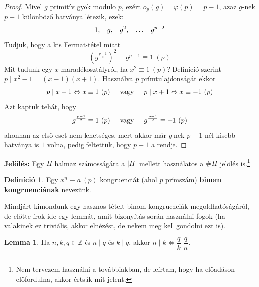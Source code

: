 \documentclass[12pt]{book}
\theoremstyle{plain} %
\theoremstyle{definition} %
\newtheorem{defi/}{Definíció}[section]
\newenvironment{defi}
  {\renewcommand{\qedsymbol}{$\clubsuit$}%
   \pushQED{\qed}\begin{defi/}}
  {\popQED\end{defi/}}
\newtheorem{lem/}{Lemma}[section]
\newenvironment{lem}
  {\renewcommand{\qedsymbol}{$\clubsuit$}%
   \pushQED{\qed}\begin{lem/}}
  {\popQED\end{lem/}}
\theoremstyle{remark}
\renewcommand\qedsymbol{$\blacksquare$}
\numberwithin{equation}{section}  %
\begin{document}
	\begin{proof}
		Mivel $g$ primitív gyök modulo $p$, ezért $o_p(g)=\varphi(p)=p-1$, azaz $g$-nek $p-1$ különböző hatványa létezik, ezek:
		\[ 1, \hspace{3mm} g, \hspace{3mm} g^2, \hspace{3mm} \ldots \hspace{3mm} g^{p-2}  \]
		Tudjuk, hogy a kis Fermat-tétel miatt
		\[ \left (g^{\frac{p-1}{2}} \right )^2 = g^{p-1} \equiv 1\ (p)  \]
		Mit tudunk egy $x$ maradékosztályról, ha $x^2\equiv 1\ (p)$? Definíció szerint $p\mid x^2-1 = (x-1)(x+1)$. Használva $p$ prímtulajdonságát ekkor
		\[ p\mid x-1 \Leftrightarrow x\equiv 1\ (p) \hspace{5mm} \text{vagy} \hspace{5mm} p\mid x+1 \Leftrightarrow x\equiv -1\ (p) \]
		Azt kaptuk tehát, hogy 
		\[ g^{\frac{p-1}{2}} \equiv 1\ (p) \hspace{5mm} \text{vagy} \hspace{5mm} g^{\frac{p-1}{2}} \equiv -1\ (p)  \]
		ahonnan az első eset nem lehetséges, mert akkor már $g$-nek $p-1$-nél kisebb hatványa is $1$ volna, pedig feltettük, hogy $p-1$ a rendje.
	\end{proof}
	
	\textbf{Jelölés:} Egy $H$ halmaz számosságára a $|H|$ mellett használatos a $\#H$ jelölés is.\footnote{Nem tervezem használni a továbbiakban, de leírtam, hogy ha előadáson előfordulna, akkor értsük mit jelent.}
	
	\begin{defi}
		Egy $x^n\equiv a\ (p)$ kongruenciát (ahol $p$ prímszám) \textbf{binom kongruenciának} nevezünk.
	\end{defi}

	Mindjárt kimondunk egy hasznos tételt binom kongruenciák megoldhatóságáról, de előtte írok ide egy lemmát, amit bizonyítás során használni fogok (ha valakinek ez triviális, akkor elnézést, de nekem meg kell gondolni ezt is).
	
	\begin{lem}\label{seged}
		Ha $n,k,q\in \mathbb{Z}$ és $n\mid q$ és $k\mid q$, akkor $n\mid k \Leftrightarrow \dfrac{q}{k} \mathrel{\bigg|} \dfrac{q}{n}$.
	\end{lem}
	
\end{document}
